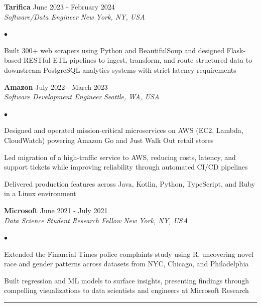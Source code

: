 \documentclass[9.5pt, letterpaper]{article}
\renewcommand{\section}[1]{%
  \vspace{6pt}\noindent{\large\textbf{#1}}\par\vspace{-5pt}\noindent\rule{\linewidth}{0.4pt}\vspace{2pt}%
}
\newenvironment{tightlist}{
  \begin{list}{$\bullet$}{
    \setlength{\topsep}{1pt}
    \setlength{\itemsep}{0pt}
    \setlength{\parsep}{0pt}
    \setlength{\leftmargin}{1.2em}
  }
}{\end{list}}
\begin{document}
\smallskip

\textbf{Tarifica} \hfill June 2023 - February 2024\\
\textit{Software/Data Engineer} \hfill \textit{New York, NY, USA}
\begin{tightlist}
  \item Built 300+ web scrapers using Python and BeautifulSoup and designed Flask-based RESTful ETL pipelines to ingest, transform, and route structured data to downstream PostgreSQL analytics systems with strict latency requirements
\end{tightlist}

\smallskip

\textbf{Amazon} \hfill July 2022 - March 2023\\
\textit{Software Development Engineer} \hfill \textit{Seattle, WA, USA}
\begin{tightlist}
  \item Designed and operated mission-critical microservices on AWS (EC2, Lambda, CloudWatch) powering Amazon Go and Just Walk Out retail stores
  \item Led migration of a high-traffic service to AWS, reducing costs, latency, and support tickets while improving reliability through automated CI/CD pipelines
  \item Delivered production features across Java, Kotlin, Python, TypeScript, and Ruby in a Linux environment
\end{tightlist}

\smallskip

\textbf{Microsoft} \hfill June 2021 - July 2021\\
\textit{Data Science Student Research Fellow} \hfill \textit{New York, NY, USA}
\begin{tightlist}
  \item Extended the Financial Times police complaints study using R, uncovering novel race and gender patterns across datasets from NYC, Chicago, and Philadelphia
  \item Built regression and ML models to surface insights, presenting findings through compelling visualizations to data scientists and engineers at Microsoft Research
\end{tightlist}

\section{RESEARCH \& PROJECTS}
\end{document}
